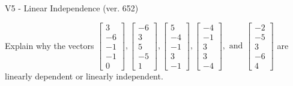 \begin{exercise}
  \begin{exerciseTitle}V5 - Linear Independence (ver. 652)\end{exerciseTitle}
  \begin{exerciseStatement}
    Explain why the vectors \(\left[\begin{array}{r}
3 \\
-6 \\
-1 \\
-1 \\
0
\end{array}\right] , \left[\begin{array}{r}
-6 \\
3 \\
5 \\
-5 \\
1
\end{array}\right] , \left[\begin{array}{r}
5 \\
-4 \\
-1 \\
3 \\
-1
\end{array}\right] , \left[\begin{array}{r}
-4 \\
-1 \\
3 \\
3 \\
-4
\end{array}\right] , \text{ and } \left[\begin{array}{r}
-2 \\
-5 \\
3 \\
-6 \\
4
\end{array}\right]\) are linearly dependent or linearly independent.	



\end{exerciseStatement}
\end{exercise}
